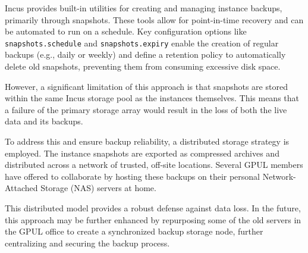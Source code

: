 Incus provides built-in utilities for creating and managing instance backups, primarily through snapshots\cite{incus-backup-docs}. These tools allow for point-in-time recovery and can be automated to run on a schedule. Key configuration options like \texttt{snapshots.schedule} and \texttt{snapshots.expiry} enable the creation of regular backups (e.g., daily or weekly) and define a retention policy to automatically delete old snapshots, preventing them from consuming excessive disk space.

However, a significant limitation of this approach is that snapshots are stored within the same Incus storage pool as the instances themselves. This means that a failure of the primary storage array would result in the loss of both the live data and its backups.

To address this and ensure backup reliability, a distributed storage strategy is employed. The instance snapshots are exported as compressed archives and distributed across a network of trusted, off-site locations. Several GPUL members have offered to collaborate by hosting these backups on their personal Network-Attached Storage (NAS) servers at home.

This distributed model provides a robust defense against data loss. In the future, this approach may be further enhanced by repurposing some of the old servers in the GPUL office to create a synchronized backup storage node, further centralizing and securing the backup process.
